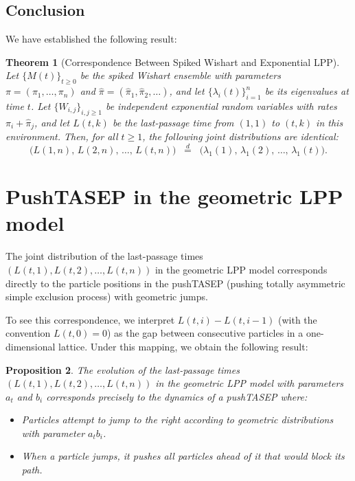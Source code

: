 \documentclass[letterpaper,11pt,oneside,reqno]{book}
\numberwithin{equation}{chapter}  %
\newtheorem{proposition}{Proposition}[chapter]  %
\newtheorem{theorem}[proposition]{Theorem}
\theoremstyle{definition}
\begin{document}
\subsection{Conclusion}

We have established the following result:

\begin{theorem}[Correspondence Between Spiked Wishart and Exponential LPP]
\label{lecture14:thm:correspondence}
Let $\{M(t)\}_{t\ge0}$ be the spiked Wishart ensemble with parameters $\pi=(\pi_1,\dots,\pi_n)$ and $\hat\pi=(\hat\pi_1,\hat\pi_2,\dots)$, and let $\{\lambda_i(t)\}_{i=1}^n$ be its eigenvalues at time $t$. Let $\{W_{i,j}\}_{i,j\ge1}$ be independent exponential random variables with rates $\pi_i + \hat\pi_j$, and let $L(t,k)$ be the last-passage time from $(1,1)$ to $(t,k)$ in this environment. Then, for all $t \ge 1$, the following joint distributions are identical:
\[
\bigl(L(1,n),\,L(2,n),\,\dots,\,L(t,n)\bigr)
\;\;\stackrel{d}{=}\;\;
\bigl(\lambda_1(1),\,\lambda_1(2),\,\dots,\,\lambda_1(t)\bigr).
\]
\end{theorem}


\section{PushTASEP in the geometric LPP model}

The joint distribution of the last-passage times $(L(t,1), L(t,2), \ldots, L(t,n))$ in the geometric LPP model corresponds directly to the particle positions in the pushTASEP (pushing totally asymmetric simple exclusion process) with geometric jumps.

To see this correspondence, we interpret $L(t,i) - L(t,i-1)$ (with the convention $L(t,0) = 0$) as the gap between consecutive particles in a one-dimensional lattice. Under this mapping, we obtain the following result:

\begin{proposition}
				The evolution of the last-passage times $(L(t,1), L(t,2), \ldots, L(t,n))$ in the geometric LPP model with parameters $a_t$ and $b_i$ corresponds precisely to the dynamics of a pushTASEP where:
				\begin{itemize}
			\item Particles attempt to jump to the right according to geometric distributions with parameter $a_t b_i$.
				\item When a particle jumps, it pushes all particles ahead of it that would block its path.
				\end{itemize}
\end{proposition}
\end{document}
